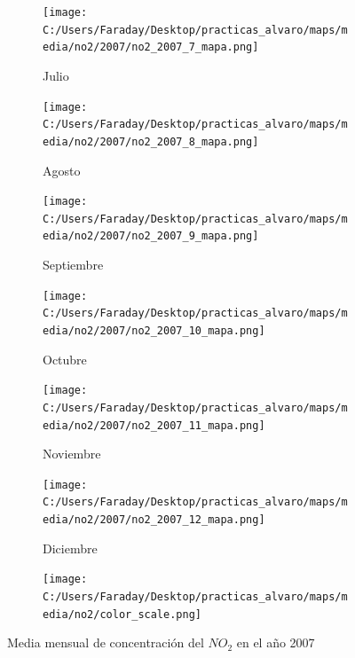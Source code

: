 \documentclass[12pt]{article}
\begin{document}
\begin{figure}[H]
\begin{subfigure}[H]{0.15\textwidth}
\texttt{[image: C:/Users/Faraday/Desktop/practicas\_alvaro/maps/media/no2/2007/no2\_2007\_7\_mapa.png]}
\captionsetup{labelformat=empty}
\caption{Julio}
\label{fig:map-no2-2007-7}
\end{subfigure}
%
\begin{subfigure}[H]{0.15\textwidth}
\texttt{[image: C:/Users/Faraday/Desktop/practicas\_alvaro/maps/media/no2/2007/no2\_2007\_8\_mapa.png]}
\captionsetup{labelformat=empty}
\caption{Agosto}
\label{fig:map-no2-2007-8}
\end{subfigure}
%
\begin{subfigure}[H]{0.15\textwidth}
\texttt{[image: C:/Users/Faraday/Desktop/practicas\_alvaro/maps/media/no2/2007/no2\_2007\_9\_mapa.png]}
\captionsetup{labelformat=empty}
\caption{Septiembre}
\label{fig:map-no2-2007-9}
\end{subfigure}
%
\begin{subfigure}[H]{0.15\textwidth}
\texttt{[image: C:/Users/Faraday/Desktop/practicas\_alvaro/maps/media/no2/2007/no2\_2007\_10\_mapa.png]}
\captionsetup{labelformat=empty}
\caption{Octubre}
\label{fig:map-no2-2007-10}
\end{subfigure}
%
\begin{subfigure}[H]{0.15\textwidth}
\texttt{[image: C:/Users/Faraday/Desktop/practicas\_alvaro/maps/media/no2/2007/no2\_2007\_11\_mapa.png]}
\captionsetup{labelformat=empty}
\caption{Noviembre}
\label{fig:map-no2-2007-11}
\end{subfigure}
%
\begin{subfigure}[H]{0.15\textwidth}
\texttt{[image: C:/Users/Faraday/Desktop/practicas\_alvaro/maps/media/no2/2007/no2\_2007\_12\_mapa.png]}
\captionsetup{labelformat=empty}
\caption{Diciembre}
\label{fig:map-no2-2007-12}
\end{subfigure}

\begin{subfigure}[H]{0.45\textwidth}
\texttt{[image: C:/Users/Faraday/Desktop/practicas\_alvaro/maps/media/no2/color\_scale.png]}
\captionsetup{labelformat=empty}
\caption{}
\end{subfigure}

\vspace*{-7mm}
\caption{Media mensual de concentración del $NO_{2}$ en el año 2007}
\label{fig:map-no2-2007}
\end{figure}
\end{document}
